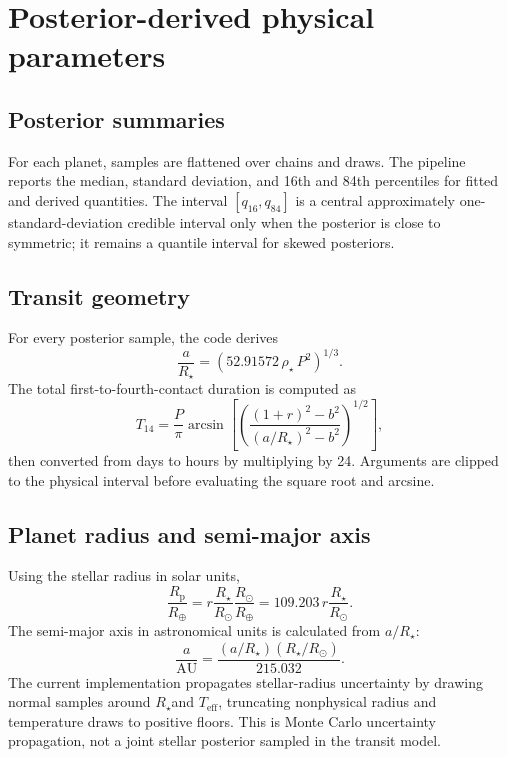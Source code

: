 \documentclass[12pt,a4paper,oneside]{report}
\newcommand{\Rsun}{\ensuremath{R_{\odot}}}
\newcommand{\Rearth}{\ensuremath{R_{\oplus}}}
\newcommand{\Rstar}{\ensuremath{R_{\star}}}
\newcommand{\Teff}{\ensuremath{T_{\mathrm{eff}}}}
\newcommand{\rhoStar}{\ensuremath{\rho_{\star}}}
\newcommand{\Rp}{\ensuremath{R_{\mathrm{p}}}}
\newcommand{\Porb}{\ensuremath{P}}
\newcommand{\Tfourteen}{\ensuremath{T_{14}}}
\begin{document}
\chapter{Posterior-derived physical parameters}
\section{Posterior summaries}
For each planet, samples are flattened over chains and draws. The pipeline
reports the median, standard deviation, and 16th and 84th percentiles for fitted
and derived quantities. The interval \([q_{16},q_{84}]\) is a central
approximately one-standard-deviation credible interval only when the posterior
is close to symmetric; it remains a quantile interval for skewed posteriors.

\section{Transit geometry}
For every posterior sample, the code derives
\begin{equation}
  \frac{a}{\Rstar}=\left(52.91572\,\rhoStar\,\Porb^2\right)^{1/3}.
\end{equation}
The total first-to-fourth-contact duration is computed as
\begin{equation}
  \Tfourteen=\frac{\Porb}{\pi}
  \arcsin\left[\left(
  \frac{(1+r)^2-b^2}{(a/\Rstar)^2-b^2}
  \right)^{1/2}\right],
\end{equation}
then converted from days to hours by multiplying by 24. Arguments are clipped
to the physical interval before evaluating the square root and arcsine.

\section{Planet radius and semi-major axis}
Using the stellar radius in solar units,
\begin{equation}
  \frac{\Rp}{\Rearth}=r\frac{\Rstar}{\Rsun}\frac{\Rsun}{\Rearth}
  =109.203\,r\frac{\Rstar}{\Rsun}.
\end{equation}
The semi-major axis in astronomical units is calculated from \(a/\Rstar\):
\begin{equation}
  \frac{a}{\mathrm{AU}}=
  \frac{(a/\Rstar)(\Rstar/\Rsun)}{215.032}.
\end{equation}
The current implementation propagates stellar-radius uncertainty by drawing
normal samples around \Rstar and \Teff, truncating nonphysical radius and
temperature draws to positive floors. This is Monte Carlo uncertainty
propagation, not a joint stellar posterior sampled in the transit model.
\end{document}

